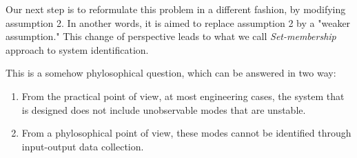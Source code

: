 Our next step is to reformulate this problem in a different fashion, by modifying assumption 2. In another words, it is aimed to replace assumption 2 by a "weaker assumption." This change of perspective leads to what we call \textit{Set-membership} approach to system identification.\\

\begin{QandAbox}
This is a somehow phylosophical question, which can be answered in two way:
\begin{enumerate}
\item From the practical point of view, at most engineering cases, the system that is designed does not include unobservable modes that are unstable. 
\item From a phylosophical point of view, these modes cannot be identified through input-output data collection.
\end{enumerate}
\end{QandAbox}

